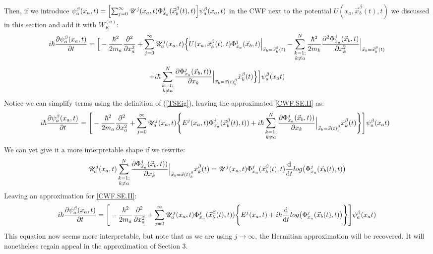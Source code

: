 \documentclass[11pt, a4paper]{article} %
\newcommand{\U}{\mathscr{U}}
\begin{document}
Then, if we introduce $\psi^\beta_a(x_a,t)=\qty[ \sum_{j=0}^\infty\U^j(x_a,t)\Phi^j_{x_a}(\vec{x}_b^\beta(t),t)]\psi^\beta_a(x_a,t)$ in the CWF next to the potential $U(x_a,\vec{x}_b^\beta(t),t)$ we discussed in this section and add it with $W^{(a)}_K$:
$$
i\hbar \pdv{\psi_a^\beta(x_a, t)}{t} = \Big[- \frac{\hbar^2}{2m_a}\pdv[2]{}{x_a} +\sum_{j=0}^\infty \U^j_a(x_a,t)\Big\{ U(x_a, \vec{x}_b^\beta(t), t)\Phi_{x_a}^j(\vec{x}_b,t)\Big\rvert_{\vec{x}_b=\vec{x}_b^\beta(t)}- \sum_{\substack{k=1; \\ k\neq a}}^{N} \frac{\hbar^2}{2m_k} \pdv[2]{ \Phi_{x_a}^j(\vec{x}_b,t)}{x_k}\Big\rvert_{\vec{x}_b=\vec{x}_b^\beta(t)}
$$
$$  +i\hbar \sum_{\substack{k=1; \\ k\neq a}}^{N}  \pdv{ \Phi_{x_a}^j(\vec{x}_b,t))}{x_k}\Big\rvert_{\vec{x}_b=\vec{x}(t)_b^\beta} \dot{x}_k^\beta(t) \Big\}\Big]\psi_a^\beta(x_a t)
$$
Notice we can simplify terms using the definition of (\ref{TSEig}), leaving the approximated \ref{CWF.SE.II} as:
$$
\hspace{-0.2cm} i\hbar \pdv{\psi_a^\beta(x_a, t)}{t} = \Bigg[- \frac{\hbar^2}{2m_a}\pdv[2]{}{x_a} +\sum_{j=0}^\infty \U^j_a(x_a,t)\Bigg\{ E^j(x_a,t) \Phi_{x_a}^j(\vec{x}_b^\beta(t),t))+i\hbar \sum_{\substack{k=1; \\ k\neq a}}^{N}  \pdv{ \Phi_{x_a}^j(\vec{x}_b,t))}{x_k}\Big\rvert_{\vec{x}_b=\vec{x}(t)_b^\beta} \dot{x}_k^\beta(t) \Bigg\}\Bigg]\psi_a^\beta(x_a t)
$$
We can yet give it a more interpretable shape if we rewrite:
$$
\U^j_a(x_a,t)\sum_{\substack{k=1; \\ k\neq a}}^{N} \pdv{ \Phi_{x_a}^j(\vec{x}_b,t))}{x_k}\Big\rvert_{\vec{x}_b=\vec{x}(t)_b^\beta} \dot{x}_k^\beta(t)= \U^j(x_a,t)\Phi^j_{x_a}(\vec{x}_b^\beta(t),t)\dv{}{t}log\qty(\Phi^j_{x_a}(\vec{x}_b(t),t))
$$
Leaving an approximation for \ref{CWF.SE.II}:
$$
i\hbar \pdv{\psi_a^\beta(x_a, t)}{t} = \Bigg[- \frac{\hbar^2}{2m_a}\pdv[2]{}{x_a} +\sum_{j=0}^\infty \U^j_a(x_a,t)\Phi_{x_a}^j(\vec{x}_b^\beta(t),t))\Bigg\{ E^j(x_a,t) +i\hbar \dv{}{t}log\qty(\Phi^j_{x_a}(\vec{x}_b(t),t)) \Bigg\}\Bigg]\psi_a^\beta(x_a t)
$$
This equation now seems more interpretable, but note that as we are using $j\rightarrow \infty$, the Hermitian approximation will be recovered. It will nonetheless regain appeal in the approximation of Section 3.
\end{document}
